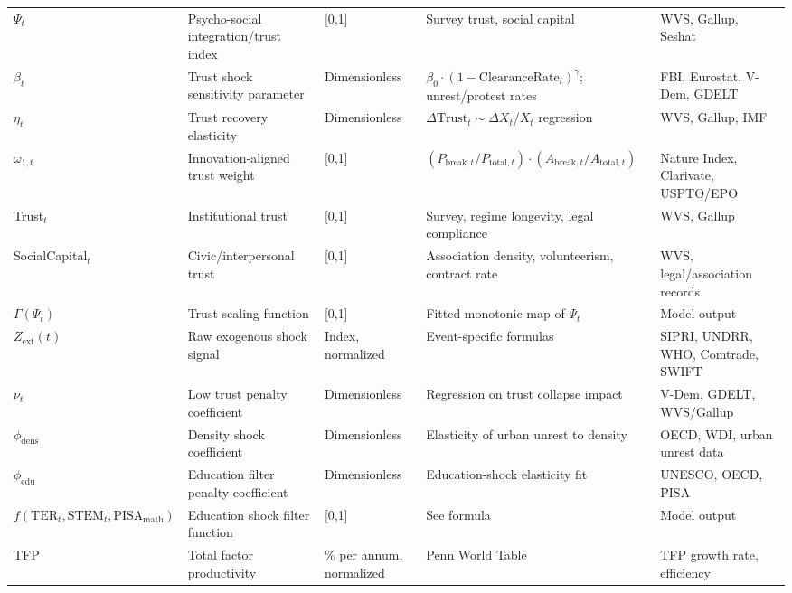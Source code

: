 \documentclass[12pt]{report}
\begin{document}
\begin{longtable}{|p{2.8cm}|p{4.3cm}|p{2.0cm}|p{3.0cm}|p{3.0cm}|}
$\Psi_t$ & Psycho-social integration/trust index & [0,1] & Survey trust, social capital & WVS, Gallup, Seshat \\
$\beta_t$ & Trust shock sensitivity parameter & Dimensionless & $\beta_0 \cdot (1 - \text{ClearanceRate}_t)^\gamma$; unrest/protest rates & FBI, Eurostat, V-Dem, GDELT \\
$\eta_t$ & Trust recovery elasticity & Dimensionless & $\Delta \text{Trust}_t \sim \Delta X_t / X_t$ regression & WVS, Gallup, IMF \\
$\omega_{1,t}$ & Innovation-aligned trust weight & [0,1] & $(P_{\text{break},t} / P_{\text{total},t}) \cdot (A_{\text{break},t} / A_{\text{total},t})$ & Nature Index, Clarivate, USPTO/EPO \\
Trust$_t$ & Institutional trust & [0,1] & Survey, regime longevity, legal compliance & WVS, Gallup \\
SocialCapital$_t$ & Civic/interpersonal trust & [0,1] & Association density, volunteerism, contract rate & WVS, legal/association records \\
$\Gamma(\Psi_t)$ & Trust scaling function & [0,1] & Fitted monotonic map of $\Psi_t$ & Model output \\
$Z_{\text{ext}}(t)$ & Raw exogenous shock signal & Index, normalized & Event-specific formulas & SIPRI, UNDRR, WHO, Comtrade, SWIFT \\
$\nu_t$ & Low trust penalty coefficient & Dimensionless & Regression on trust collapse impact & V-Dem, GDELT, WVS/Gallup \\
$\phi_{\text{dens}}$ & Density shock coefficient & Dimensionless & Elasticity of urban unrest to density & OECD, WDI, urban unrest data \\
$\phi_{\text{edu}}$ & Education filter penalty coefficient & Dimensionless & Education-shock elasticity fit & UNESCO, OECD, PISA \\
$f(\text{TER}_t, \text{STEM}_t, \text{PISA}_\text{math})$ & Education shock filter function & [0,1] & See formula & Model output \\
TFP & Total factor productivity & \% per annum, normalized & Penn World Table & TFP growth rate, efficiency \\

\end{longtable}
\end{document}
